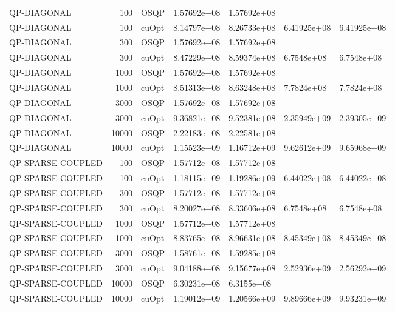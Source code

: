 \begin{table}
\begin{tabular}{lrlllll}
QP-DIAGONAL & 100 & OSQP & 1.57692e+08 & 1.57692e+08 &  &  \\
QP-DIAGONAL & 100 & cuOpt & 8.14797e+08 & 8.26733e+08 & 6.41925e+08 & 6.41925e+08 \\
QP-DIAGONAL & 300 & OSQP & 1.57692e+08 & 1.57692e+08 &  &  \\
QP-DIAGONAL & 300 & cuOpt & 8.47229e+08 & 8.59374e+08 & 6.7548e+08 & 6.7548e+08 \\
QP-DIAGONAL & 1000 & OSQP & 1.57692e+08 & 1.57692e+08 &  &  \\
QP-DIAGONAL & 1000 & cuOpt & 8.51313e+08 & 8.63248e+08 & 7.7824e+08 & 7.7824e+08 \\
QP-DIAGONAL & 3000 & OSQP & 1.57692e+08 & 1.57692e+08 &  &  \\
QP-DIAGONAL & 3000 & cuOpt & 9.36821e+08 & 9.52381e+08 & 2.35949e+09 & 2.39305e+09 \\
QP-DIAGONAL & 10000 & OSQP & 2.22183e+08 & 2.22581e+08 &  &  \\
QP-DIAGONAL & 10000 & cuOpt & 1.15523e+09 & 1.16712e+09 & 9.62612e+09 & 9.65968e+09 \\
QP-SPARSE-COUPLED & 100 & OSQP & 1.57712e+08 & 1.57712e+08 &  &  \\
QP-SPARSE-COUPLED & 100 & cuOpt & 1.18115e+09 & 1.19286e+09 & 6.44022e+08 & 6.44022e+08 \\
QP-SPARSE-COUPLED & 300 & OSQP & 1.57712e+08 & 1.57712e+08 &  &  \\
QP-SPARSE-COUPLED & 300 & cuOpt & 8.20027e+08 & 8.33606e+08 & 6.7548e+08 & 6.7548e+08 \\
QP-SPARSE-COUPLED & 1000 & OSQP & 1.57712e+08 & 1.57712e+08 &  &  \\
QP-SPARSE-COUPLED & 1000 & cuOpt & 8.83765e+08 & 8.96631e+08 & 8.45349e+08 & 8.45349e+08 \\
QP-SPARSE-COUPLED & 3000 & OSQP & 1.58761e+08 & 1.59285e+08 &  &  \\
QP-SPARSE-COUPLED & 3000 & cuOpt & 9.04188e+08 & 9.15677e+08 & 2.52936e+09 & 2.56292e+09 \\
QP-SPARSE-COUPLED & 10000 & OSQP & 6.30231e+08 & 6.3155e+08 &  &  \\
QP-SPARSE-COUPLED & 10000 & cuOpt & 1.19012e+09 & 1.20566e+09 & 9.89666e+09 & 9.93231e+09 \\
\bottomrule
\end{tabular}
\end{table}
